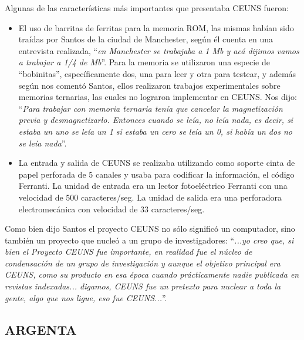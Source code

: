 \documentclass[%
  	final,
%
	notitlepage,
	narroweqnarray,
	inline,
 	twoside,
	]{ieee}
\begin{document}
Algunas de las caracter\'isticas m\'as importantes que presentaba CEUNS fueron:\\

\begin{itemize}

\item El uso de barritas de ferritas para la memoria ROM, las mismas hab\'ian sido tra\'idas por Santos de la ciudad de Manchester, seg\'un \'el cuenta en una entrevista realizada, ``\textit{en Manchester se trabajaba a 1 Mb y ac\'a dijimos vamos a trabajar a 1/4 de Mb}''. Para la memoria se utilizaron una especie de ``bobinitas'', espec\'ificamente dos, una para leer y otra para testear, y adem\'as seg\'un nos coment\'o Santos, ellos realizaron trabajos experimentales sobre memorias ternarias, las cuales no lograron implementar en CEUNS. Nos dijo: ``\textit{Para trabajar con memoria ternaria ten\'ia que cancelar la magnetizaci\'on previa y desmagnetizarlo. Entonces cuando se le\'ia, no le\'ia nada, es decir, si estaba un uno se le\'ia un 1 si estaba un cero se le\'ia un 0, si hab\'ia un dos no se le\'ia nada}''.\\

\item La entrada y salida de CEUNS se realizaba utilizando como soporte cinta de papel perforada de 5 canales y usaba para codificar la informaci\'on, el c\'odigo Ferranti. La unidad de entrada era un lector fotoel\'ectrico Ferranti con una velocidad de 500 caracteres/seg. La unidad de salida era una perforadora electromec\'anica con velocidad de 33 caracteres/seg.\\

\end{itemize}

Como bien dijo Santos el proyecto CEUNS no s\'olo signific\'o un computador, sino tambi\'en un proyecto que nucle\'o a un grupo de investigadores:
``\textit{...yo creo que, si bien el Proyecto CEUNS fue importante, en realidad fue el n\'ucleo de condensaci\'on de un grupo de investigaci\'on y aunque el objetivo principal era CEUNS, como su producto en esa \'epoca cuando pr\'acticamente nadie publicada en revistas indexadas... digamos, CEUNS fue un pretexto para nuclear a toda la gente, algo que nos ligue, eso fue CEUNS...}''.

\subsection*{ARGENTA}
\end{document}

